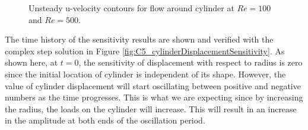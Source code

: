\begin{figure}[H]
    \quad
    \caption{Unsteady u-velocity contours for flow around cylinder at $Re = 100$ and $Re = 500$.}
    \label{fig:C5_cylinderFSIvelocity}
\end{figure}
%
The time history of the sensitivity results are shown and verified with the complex step solution in Figure \ref{fig:C5_cylinderDisplacementSensitivity}. As shown here, at $t=0$, the sensitivity of displacement with respect to radius is zero since the initial location of cylinder is independent of its shape. However, the value of cylinder displacement will start oscillating between positive and negative numbers as the time progresses. This is what we are expecting since by increasing the radius, the loads on the cylinder will increase. This will result in an increase in the amplitude at both ends of the oscillation period.
%
